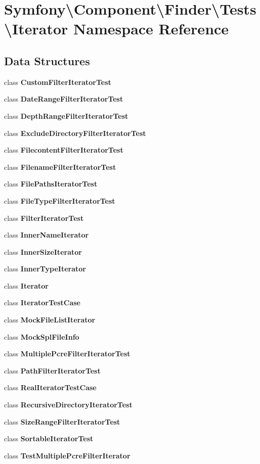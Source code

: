 \section{Symfony\textbackslash{}Component\textbackslash{}Finder\textbackslash{}Tests\textbackslash{}Iterator Namespace Reference}
\label{namespace_symfony_1_1_component_1_1_finder_1_1_tests_1_1_iterator}
\subsection*{Data Structures}
\begin{DoxyCompactItemize}
\item 
class {\bf Custom\+Filter\+Iterator\+Test}
\item 
class {\bf Date\+Range\+Filter\+Iterator\+Test}
\item 
class {\bf Depth\+Range\+Filter\+Iterator\+Test}
\item 
class {\bf Exclude\+Directory\+Filter\+Iterator\+Test}
\item 
class {\bf Filecontent\+Filter\+Iterator\+Test}
\item 
class {\bf Filename\+Filter\+Iterator\+Test}
\item 
class {\bf File\+Paths\+Iterator\+Test}
\item 
class {\bf File\+Type\+Filter\+Iterator\+Test}
\item 
class {\bf Filter\+Iterator\+Test}
\item 
class {\bf Inner\+Name\+Iterator}
\item 
class {\bf Inner\+Size\+Iterator}
\item 
class {\bf Inner\+Type\+Iterator}
\item 
class {\bf Iterator}
\item 
class {\bf Iterator\+Test\+Case}
\item 
class {\bf Mock\+File\+List\+Iterator}
\item 
class {\bf Mock\+Spl\+File\+Info}
\item 
class {\bf Multiple\+Pcre\+Filter\+Iterator\+Test}
\item 
class {\bf Path\+Filter\+Iterator\+Test}
\item 
class {\bf Real\+Iterator\+Test\+Case}
\item 
class {\bf Recursive\+Directory\+Iterator\+Test}
\item 
class {\bf Size\+Range\+Filter\+Iterator\+Test}
\item 
class {\bf Sortable\+Iterator\+Test}
\item 
class {\bf Test\+Multiple\+Pcre\+Filter\+Iterator}
\end{DoxyCompactItemize}
